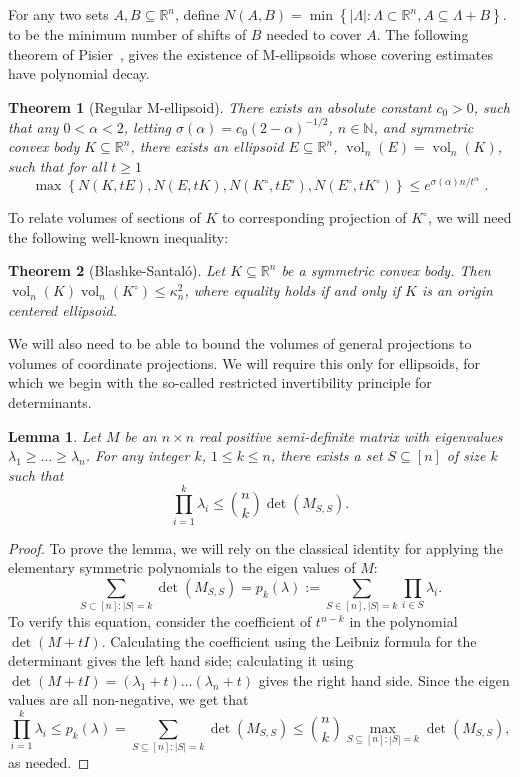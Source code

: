 \documentclass[12pt]{article}
\newtheorem{theorem}{Theorem}
\newtheorem{lemma}{Lemma}
\newcommand{\R}{{\mathbb{R}}}
\newcommand{\N}{{\mathbb{N}}}
\newcommand{\set}[1]{\left\{ #1 \right\}}
\DeclareMathOperator{\vol}{vol}
\begin{document}
For any two sets $A,B \subseteq \R^n$, define $N(A,B) = \min \set{|\Lambda|:
\Lambda \subset \R^n, A \subseteq \Lambda+B}$.  to be the minimum number of
shifts of $B$ needed to cover $A$. The following theorem of
Pisier~\cite{Pisier-book}, gives the existence of M-ellipsoids whose covering
estimates have polynomial decay. 

\begin{theorem}[Regular M-ellipsoid]
There exists an absolute constant $c_0 > 0$, such that any $0 < \alpha < 2$,
letting $\sigma(\alpha) = c_0(2-\alpha)^{-1/2}$, $n \in \N$, and symmetric
convex body $K \subseteq \R^n$, there exists an ellipsoid $E \subseteq \R^n$,
$\vol_n(E)=\vol_n(K)$, such that for all $t \geq 1$
\[
\max \set{N(K,tE),N(E,tK),N(K^\circ,tE^\circ),N(E^\circ,tK^\circ)} \leq
e^{\sigma(\alpha) n / t^\alpha} \text{ .}
\]
\end{theorem}

To relate volumes of sections of $K$ to corresponding projection of $K^\circ$,
we will need the following well-known inequality:

\begin{theorem}[Blashke-Santal{\'o}]\label{thm:santalo} 
Let $K \subseteq \R^n$ be a symmetric convex body. Then $\vol_n(K)
\vol_n(K^\circ) \leq \kappa_n^2$, where equality holds if and only if $K$ is
an origin centered ellipsoid. 
\end{theorem}

We will also need to be able to bound the volumes of general projections to
volumes of coordinate projections. We will require this only for ellipsoids, for
which we begin with the so-called restricted invertibility principle for
determinants. 

\begin{lemma}\label{lm:rip-det}
  Let $M$ be an $n\times n$ real positive semi-definite matrix with
  eigenvalues $\lambda_1 \ge \ldots \ge \lambda_n$. For any integer
  $k$, $1 \le k \le n$, there exists a set $S \subseteq [n]$ of size $k$
  such that
  \[\prod_{i=1}^k \lambda_i \leq \binom{n}{k} \det(M_{S,S}).\]
\end{lemma}
\begin{proof}
To prove the lemma, we will rely on the classical identity for applying the
elementary symmetric polynomials to the eigen values of $M$:
\begin{equation*}
 \sum_{S \subset [n]: |S| = k}\det(M_{S,S}) = p_k(\lambda) := 
\sum_{S \in [n],|S|=k} \prod_{i \in S} \lambda_i.
\end{equation*}
To verify this equation, consider the coefficient of $t^{n-k}$ in the polynomial
$\det(M + tI)$. Calculating the coefficient using the Leibniz formula for the
determinant gives the left hand side; calculating it using $\det(M + tI) =
(\lambda_1 + t)\ldots(\lambda_n + t)$ gives the right hand side. Since the eigen
values are all non-negative, we get that
\[
\prod_{i=1}^k \lambda_i \leq p_k(\lambda) =  
 \sum_{S \subseteq [n]: |S|=k} \det(M_{S,S}) \leq \binom{n}{k} \max_{S
\subseteq [n]: |S|=k} \det(M_{S,S}),
\]
as needed.
\end{proof}
\end{document}
